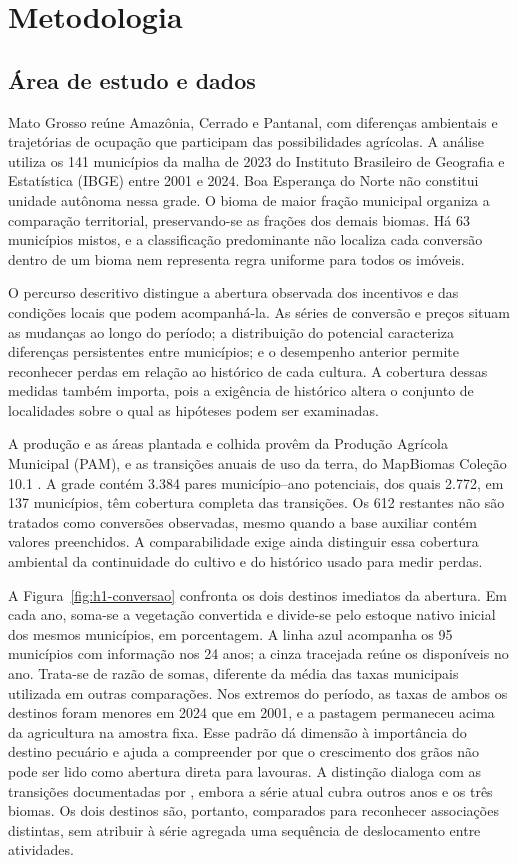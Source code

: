 \section{Metodologia}
\subsection{Área de estudo e dados}
\label{sec:dados}

Mato Grosso reúne Amazônia, Cerrado e Pantanal, com diferenças ambientais e trajetórias de ocupação que participam das possibilidades agrícolas. A análise utiliza os 141 municípios da malha de 2023 do Instituto Brasileiro de Geografia e Estatística (IBGE) entre 2001 e 2024. Boa Esperança do Norte não constitui unidade autônoma nessa grade. O bioma de maior fração municipal organiza a comparação territorial, preservando-se as frações dos demais biomas. Há 63 municípios mistos, e a classificação predominante não localiza cada conversão dentro de um bioma nem representa regra uniforme para todos os imóveis.

O percurso descritivo distingue a abertura observada dos incentivos e das condições locais que podem acompanhá-la. As séries de conversão e preços situam as mudanças ao longo do período; a distribuição do potencial caracteriza diferenças persistentes entre municípios; e o desempenho anterior permite reconhecer perdas em relação ao histórico de cada cultura. A cobertura dessas medidas também importa, pois a exigência de histórico altera o conjunto de localidades sobre o qual as hipóteses podem ser examinadas.

A produção e as áreas plantada e colhida provêm da Produção Agrícola Municipal (PAM), e as transições anuais de uso da terra, do MapBiomas Coleção 10.1 \cite{IBGEPAM2026,MapBiomas2026}. A grade contém 3.384 pares município--ano potenciais, dos quais 2.772, em 137 municípios, têm cobertura completa das transições. Os 612 restantes não são tratados como conversões observadas, mesmo quando a base auxiliar contém valores preenchidos. A comparabilidade exige ainda distinguir essa cobertura ambiental da continuidade do cultivo e do histórico usado para medir perdas.

A Figura~\ref{fig:h1-conversao} confronta os dois destinos imediatos da abertura. Em cada ano, soma-se a vegetação convertida e divide-se pelo estoque nativo inicial dos mesmos municípios, em porcentagem. A linha azul acompanha os 95 municípios com informação nos 24 anos; a cinza tracejada reúne os disponíveis no ano. Trata-se de razão de somas, diferente da média das taxas municipais utilizada em outras comparações. Nos extremos do período, as taxas de ambos os destinos foram menores em 2024 que em 2001, e a pastagem permaneceu acima da agricultura na amostra fixa. Esse padrão dá dimensão à importância do destino pecuário e ajuda a compreender por que o crescimento dos grãos não pode ser lido como abertura direta para lavouras. A distinção dialoga com as transições documentadas por , embora a série atual cubra outros anos e os três biomas. Os dois destinos são, portanto, comparados para reconhecer associações distintas, sem atribuir à série agregada uma sequência de deslocamento entre atividades.

